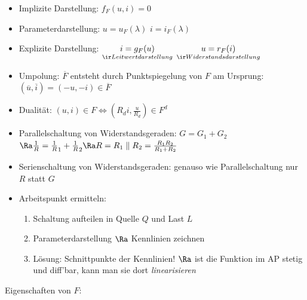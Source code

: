 \documentclass[fs, footer]{latex4ei}
\begin{document}
\begin{multicols*}{4}
{\begin{itemize}
	\item Implizite Darstellung: $f_F (u,i) = 0$
	\item Parameterdarstellung: $u = u_F ( \lambda )$ \quad $ i = i_F (\lambda )$
	\item Explizite Darstellung: $\underset{\ir Leitwertdarstellung}{i = g_F (u)}$ \quad $\underset{\ir Widerstandsdarstellung}{u = r_F (i)}$
	\item Umpolung: $\overline F$ entsteht durch Punktspiegelung von $F$ am Ursprung: $(\overline u, \overline i) = (- u, - i) \in \overline F$
	\item Dualität: $(u,i) \in F \Leftrightarrow ( R_d i, \frac{ u}{ R_d}) \in F^d$
	\item Parallelschaltung von Widerstandsgeraden: $G = G_1 + G_2$ \\
	$\Ra \frac 1 R = \frac 1 R_1 + \frac 1 R_2 \Ra R = R_1 \parallel R_2 = \frac{R_1 R_2}{R_1 + R_2}$
	\item Serienschaltung von Widerstandsgeraden: genauso wie Parallelschaltung nur $R$ statt $G$
	\item Arbeitspunkt ermitteln:
		\begin{enumerate}
			\item Schaltung aufteilen in Quelle $Q$ und Last $L$
			\item Parameterdarstellung $\Ra$ Kennlinien zeichnen
			\item Lösung: Schnittpunkte der Kennlinien! $\Ra$ ist die Funktion im AP stetig und diff'bar, kann man sie dort \emph{linearisieren}
		\end{enumerate}
\end{itemize}

Eigenschaften von $F$:



}
\end{multicols*}
\end{document}
